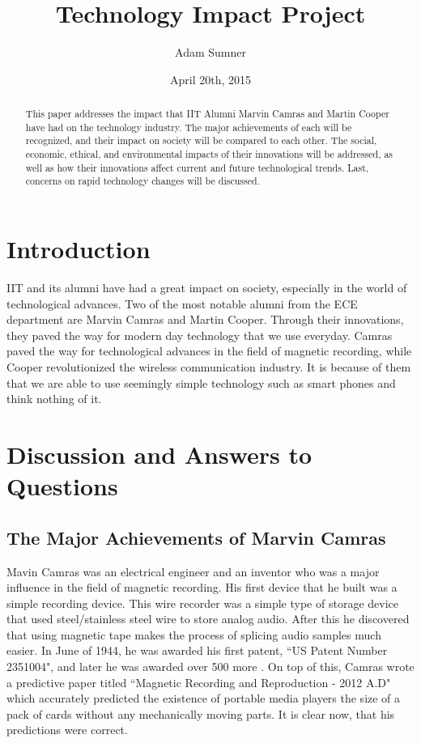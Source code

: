 \documentclass[12pt,letter]{article}
\title{\textbf{Technology Impact Project}}
\author{Adam Sumner}
\date{April 20th, 2015}
\begin{document}
\maketitle

\begin{abstract}
This paper addresses the impact that IIT Alumni Marvin Camras and Martin Cooper have had on the technology industry. The major achievements of each will be recognized, and their impact on society will be compared to each other. The social, economic, ethical, and environmental impacts of their innovations will be addressed, as well as how their innovations affect current and future technological trends. Last, concerns on rapid technology changes will be discussed.
\end{abstract}

\section{Introduction}
IIT and its alumni have had a great impact on society, especially in the world of technological advances. Two of the most notable alumni from the ECE department are Marvin Camras and Martin Cooper. Through their innovations, they paved the way for modern day technology that we use everyday. Camras paved the way for technological advances in the field of magnetic recording, while Cooper revolutionized the wireless communication industry. It is because of them that we are able to use seemingly simple technology such as smart phones and think nothing of it.

\section{Discussion and Answers to Questions}
\subsection{The Major Achievements of Marvin Camras}
Mavin Camras was an electrical engineer and an inventor who was a major influence in the field of magnetic recording. His first device that he built was a simple recording device. This wire recorder was a simple type of storage device that used steel/stainless steel wire to store analog audio\cite{wire}. After this he discovered that using magnetic tape makes the process of splicing audio samples much easier. In June of 1944, he was awarded his first patent, ``US Patent Number 2351004", and later he was awarded over 500 more \cite{patent}. On top of this, Camras wrote a predictive paper titled ``Magnetic Recording and Reproduction - 2012 A.D" which accurately predicted the existence of portable media players the size of a pack of cards without any mechanically moving parts. It is clear now, that his predictions were correct.
\end{document}
